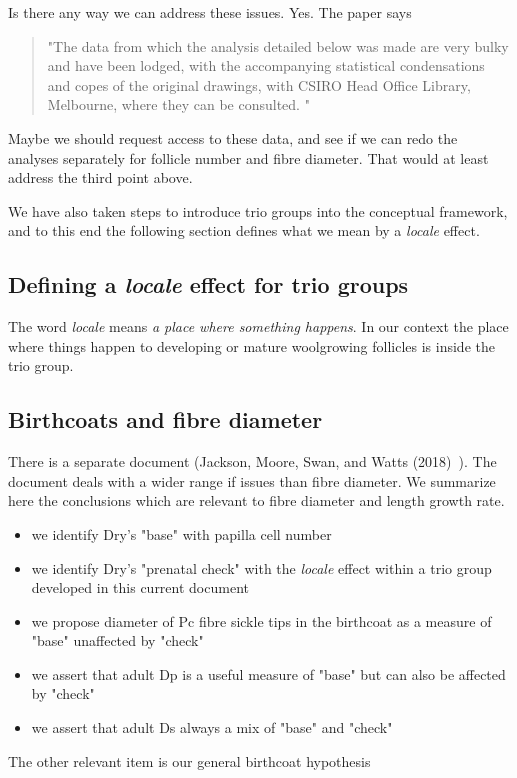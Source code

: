 \documentclass[titlepage]{article}  %
\begin{document}
Is there any way we can address these issues. Yes. The paper says
\begin{quote}
"The data from which the analysis detailed below was made are very bulky and have been lodged, with the accompanying statistical condensations and copes of the original drawings, with CSIRO Head Office Library, Melbourne, where they can be consulted. "
\end{quote}
Maybe we should request access to these data, and see if we can redo the analyses separately for follicle number and fibre diameter. That would at least address the third point above.

We have also taken steps to introduce trio groups into the conceptual framework, and to this end the following section defines what we mean by a {\em locale} effect.

\subsection{Defining a {\em locale} effect for trio groups}
The word {\em locale} means {\em a place where something happens}.  In our context the place where things happen to developing or mature woolgrowing follicles is inside the trio group.

\subsection{Birthcoats and fibre diameter}
There is a separate document (Jackson, Moore, Swan, and Watts (2018)~\cite{jack:18b}). The document deals with a wider range if issues than fibre diameter. We summarize here the conclusions which are relevant to fibre diameter and length growth rate.
\begin{itemize}
\item we identify Dry's "base" with papilla cell number
\item we identify Dry's "prenatal check" with the {\em locale} effect within a trio group developed in this current document
\item we propose diameter of Pc fibre sickle tips in the birthcoat as a measure of "base" unaffected by "check"
\item we assert that adult Dp is a useful measure of "base" but can also be affected by "check"
\item we assert that adult Ds always a mix of "base" and "check"
\end{itemize}

The other relevant item is our general birthcoat hypothesis
\end{document}

